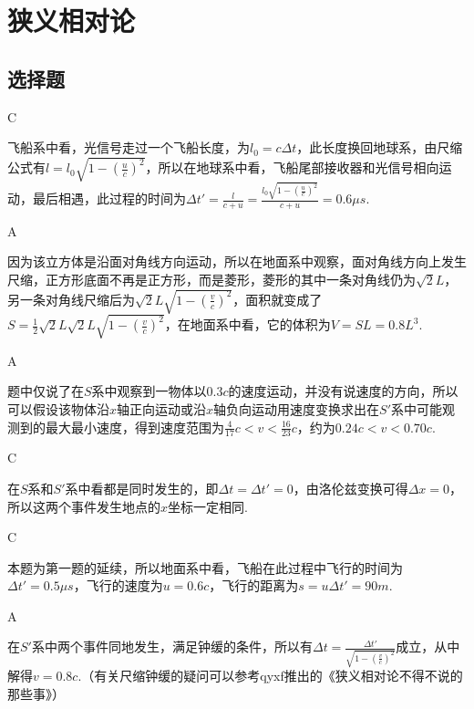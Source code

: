 \documentclass[b5paper,opensource,sourcefont,parskip]{qyxf-book}
\begin{document}
\chapter{狭义相对论}  %
\section{选择题}  %

C  %

\solve
飞船系中看，光信号走过一个飞船长度，为$l_0=c\Delta t$，此长度换回地球系，由尺缩公式有$l=l_0\sqrt{1-\left(\frac{u}{c}\right)^2}$，所以在地球系中看，飞船尾部接收器和光信号相向运动，最后相遇，此过程的时间为$\Delta t'=\frac{l}{c+u}=\frac{l_0\sqrt{1-(\frac{u}{c})^2}}{c+u}=0.6\mu s$.

A

\solve
因为该立方体是沿面对角线方向运动，所以在地面系中观察，面对角线方向上发生尺缩，正方形底面不再是正方形，而是菱形，菱形的其中一条对角线仍为$\sqrt{2}L$，另一条对角线尺缩后为$\sqrt{2}L\sqrt{1-(\frac{v}{c})^2}$，面积就变成了$S=\frac{1}{2}\sqrt{2}L\sqrt{2}L\sqrt{1-(\frac{v}{c})^2}$，在地面系中看，它的体积为$V=SL=0.8L^3$.

A

\solve
题中仅说了在$S$系中观察到一物体以$0.3c$的速度运动，并没有说速度的方向，所以可以假设该物体沿$x$轴正向运动或沿$x$轴负向运动用速度变换求出在$S'$系中可能观测到的最大最小速度，得到速度范围为$\frac{4}{17}c<v<\frac{16}{23}c$，约为$0.24c<v<0.70c$.

C

\solve
在$S$系和$S'$系中看都是同时发生的，即$\Delta t=\Delta t'=0$，由洛伦兹变换可得$\Delta x=0$，所以这两个事件发生地点的$x$坐标一定相同.

C

\solve
本题为第一题的延续，所以地面系中看，飞船在此过程中飞行的时间为$\Delta t'=0.5\mu s$，飞行的速度为$u=0.6c$，飞行的距离为$s=u\Delta t'=90m$.

A

\solve
在$S'$系中两个事件同地发生，满足钟缓的条件，所以有$\Delta t=\frac{\Delta t'}{\sqrt{1-(\frac{v}{c})^2}}$成立，从中解得$v=0.8c$.（有关尺缩钟缓的疑问可以参考qyxf推出的《狭义相对论不得不说的那些事》）
\end{document}
